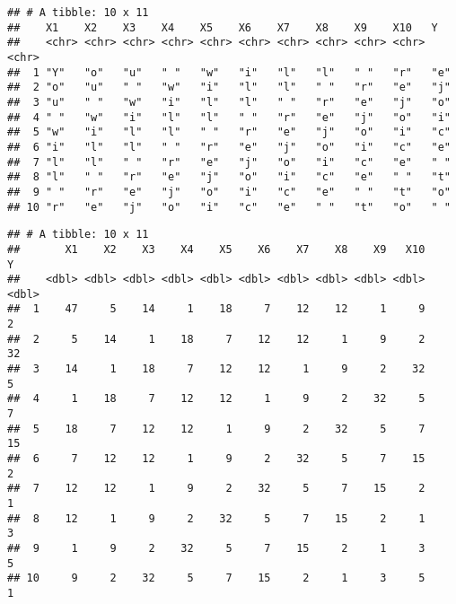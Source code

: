 \documentclass[t]{beamer}\usepackage[]{graphicx}\usepackage[]{color}
\makeatletter
\newenvironment{kframe}{%
 \def\at@end@of@kframe{}%
 \ifinner\ifhmode%
  \def\at@end@of@kframe{\end{minipage}}%
  \begin{minipage}{\columnwidth}%
 \fi\fi%
 \def\FrameCommand##1{\hskip\@totalleftmargin \hskip-\fboxsep
 \colorbox{shadecolor}{##1}\hskip-\fboxsep
     \hskip-\linewidth \hskip-\@totalleftmargin \hskip\columnwidth}%
 \MakeFramed {\advance\hsize-\width
   \@totalleftmargin\z@ \linewidth\hsize
   \@setminipage}}%
 {\par\unskip\endMakeFramed%
 \at@end@of@kframe}
\newenvironment{knitrout}{}{} %
\makeatother
\begin{document}
\begin{frame}[fragile]
\tiny

\begin{knitrout}
\color{fgcolor}\begin{kframe}
\begin{verbatim}
## # A tibble: 10 x 11
##    X1    X2    X3    X4    X5    X6    X7    X8    X9    X10   Y    
##    <chr> <chr> <chr> <chr> <chr> <chr> <chr> <chr> <chr> <chr> <chr>
##  1 "Y"   "o"   "u"   " "   "w"   "i"   "l"   "l"   " "   "r"   "e"  
##  2 "o"   "u"   " "   "w"   "i"   "l"   "l"   " "   "r"   "e"   "j"  
##  3 "u"   " "   "w"   "i"   "l"   "l"   " "   "r"   "e"   "j"   "o"  
##  4 " "   "w"   "i"   "l"   "l"   " "   "r"   "e"   "j"   "o"   "i"  
##  5 "w"   "i"   "l"   "l"   " "   "r"   "e"   "j"   "o"   "i"   "c"  
##  6 "i"   "l"   "l"   " "   "r"   "e"   "j"   "o"   "i"   "c"   "e"  
##  7 "l"   "l"   " "   "r"   "e"   "j"   "o"   "i"   "c"   "e"   " "  
##  8 "l"   " "   "r"   "e"   "j"   "o"   "i"   "c"   "e"   " "   "t"  
##  9 " "   "r"   "e"   "j"   "o"   "i"   "c"   "e"   " "   "t"   "o"  
## 10 "r"   "e"   "j"   "o"   "i"   "c"   "e"   " "   "t"   "o"   " "
\end{verbatim}
\end{kframe}
\end{knitrout}
\begin{knitrout}
\color{fgcolor}\begin{kframe}
\begin{verbatim}
## # A tibble: 10 x 11
##       X1    X2    X3    X4    X5    X6    X7    X8    X9   X10     Y
##    <dbl> <dbl> <dbl> <dbl> <dbl> <dbl> <dbl> <dbl> <dbl> <dbl> <dbl>
##  1    47     5    14     1    18     7    12    12     1     9     2
##  2     5    14     1    18     7    12    12     1     9     2    32
##  3    14     1    18     7    12    12     1     9     2    32     5
##  4     1    18     7    12    12     1     9     2    32     5     7
##  5    18     7    12    12     1     9     2    32     5     7    15
##  6     7    12    12     1     9     2    32     5     7    15     2
##  7    12    12     1     9     2    32     5     7    15     2     1
##  8    12     1     9     2    32     5     7    15     2     1     3
##  9     1     9     2    32     5     7    15     2     1     3     5
## 10     9     2    32     5     7    15     2     1     3     5     1
\end{verbatim}
\end{kframe}
\end{knitrout}
\end{frame}
\end{document}
